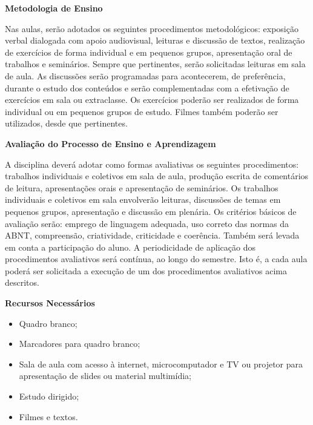 \begin{snugshade}\begin{center}\textbf{
    Metodologia de Ensino
}\end{center}\end{snugshade}

\noindent
Nas aulas, serão adotados os seguintes procedimentos metodológicos: exposição verbal dialogada com apoio audiovisual, leituras e discussão de textos, realização de exercícios de forma individual e em pequenos grupos, apresentação oral de trabalhos e seminários. Sempre que pertinentes, serão solicitadas leituras em sala de aula. As discussões serão programadas para acontecerem, de preferência, durante o estudo dos conteúdos e serão complementadas com a efetivação de exercícios em sala ou extraclasse. Os exercícios poderão ser realizados de forma individual ou em pequenos grupos de estudo. Filmes também poderão ser utilizados, desde que pertinentes.

\begin{snugshade}\begin{center}\textbf{
    Avaliação do Processo de Ensino e Aprendizagem
}\end{center}\end{snugshade}

\noindent
         A disciplina deverá adotar como formas avaliativas os seguintes procedimentos: trabalhos individuais e coletivos em sala de aula, produção escrita de comentários de leitura, apresentações orais e apresentação de seminários. Os trabalhos individuais e coletivos em sala envolverão leituras, discussões de temas em pequenos grupos, apresentação e discussão em plenária. Os critérios básicos de avaliação serão: emprego de linguagem adequada, uso correto das normas da ABNT, compreensão, criatividade, criticidade e coerência. Também será levada em conta a participação do aluno. A periodicidade de aplicação dos procedimentos avaliativos será contínua, ao longo do semestre. Isto é, a cada aula poderá ser solicitada a execução de um dos procedimentos avaliativos acima descritos.

\begin{snugshade}\begin{center}\textbf{
    Recursos Necessários
    \vphantom{q} %
}\end{center}\end{snugshade}

\begin{itemize}
  \item Quadro branco;
  \item Marcadores para quadro branco;
  \item Sala de aula com acesso à internet, microcomputador e TV ou projetor para apresentação de slides ou material multimídia;
  \item Estudo dirigido;
  \item Filmes e textos.
\end{itemize}

